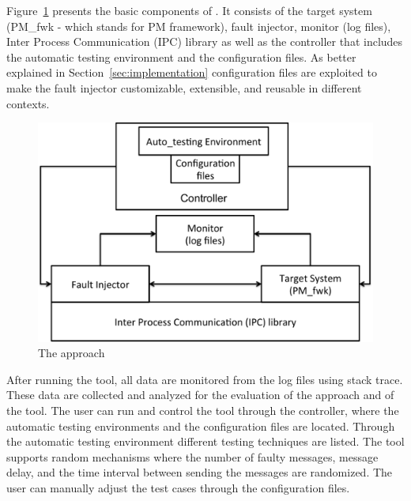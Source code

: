 




Figure~\ref{Fualt_injection_Model} presents the basic components of \approach{}. It consists of the target system (PM\_fwk - which stands for PM framework), fault injector, monitor (log files), Inter Process Communication (IPC) library as well as the controller that includes the automatic testing environment and the configuration files.
As better explained in Section~\ref{sec:implementation} configuration files are exploited to make the fault injector customizable, extensible, and reusable in different contexts.

\begin{figure}[htb]
\begin{center}
\includegraphics[width=\columnwidth]{figure/faultInjectionApproach.pdf}
\caption{The \approach{} approach \label{Fualt_injection_Model}}
\end{center}
\end{figure}

After running the \approach{} tool, all data are monitored from the log files using stack trace. These data are collected and analyzed for the evaluation of the approach and of the tool. %
The user can run and control the tool through the controller, where the automatic testing environments and the configuration files are located. Through the automatic testing environment different testing techniques are listed. The \approach{} tool supports random mechanisms where the number of faulty messages, message delay, and the time interval between sending the messages are randomized. The user can manually adjust the test cases through the configuration files.    

